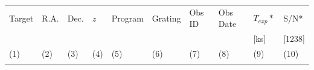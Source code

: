 \documentclass[twocolumn,tighten]{aastex6}
\begin{document}
\begin{table}[ht]\footnotesize
\begin{center}
\begin{tabular}{l l l l l l l l l l}
 \hline \hline
  Target 		& R.A. 		& Dec. 		& \textit{z}		 & Program 	  & Grating 	  & Obs ID 	    & Obs Date 	    & $T_{exp}*$     & S/N*  \\ 
  	    		& 	       		&	  		& 		  	 & 		    	  & 		  	  & 		  	   & 		     	    & 	        [ks]        & [1238] \\ 
 \scriptsize (1)  & \scriptsize (2) & \scriptsize (3) & \scriptsize (4) & \scriptsize (5) & \scriptsize (6) & \scriptsize  (7) & \scriptsize (8) & \scriptsize (9) & \scriptsize (10)  \\ \hline \hline
\\
    

\end{tabular}
\end{center}
\end{table}
\end{document}
